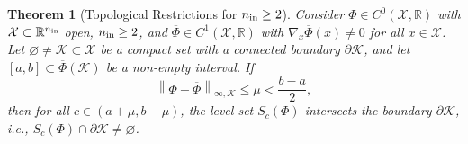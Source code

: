 \documentclass[10pt]{article}
\newtheorem{theorem}{Theorem}[section]
\theoremstyle{definition}
\numberwithin{equation}{section}
\newcommand\norm[1]{\left\lVert#1\right\rVert}
\newcommand{\R}{\mathbb{R}}
\begin{document}
\begin{theorem}[Topological Restrictions for $n_{\textup{in}} \geq 2$] \label{thm:constraints_nd}
    Consider $\Phi \in C^0(\mathcal{X},\R)$ with $\mathcal{X}\subset \R^{n_{\textup{in}}}$ open, $n_{\textup{in}} \geq 2$, and $\overline{\Phi} \in C^1(\mathcal{X},\R)$ with $\nabla_x\overline{\Phi}(x) \neq 0$ for all $x\in \mathcal{X}$. Let $\varnothing \neq \mathcal{K} \subset \mathcal{X}$ be a compact set with a connected boundary $\partial \mathcal{K}$, and let $[a,b] \subset \overline{\Phi}(\mathcal{K})$ be a non-empty interval. If 
    \begin{equation*}
        \norm{\Phi - \overline{\Phi}}_{\infty,\mathcal{K}}  \leq \mu < \frac{b-a}{2},
    \end{equation*}
    then for all $c \in (a+\mu, b-\mu)$, the level set $S_c(\Phi)$ intersects the boundary $\partial \mathcal{K}$, i.e., $S_c(\Phi) \cap \partial \mathcal{K} \neq \varnothing$.
\end{theorem}
\end{document}
